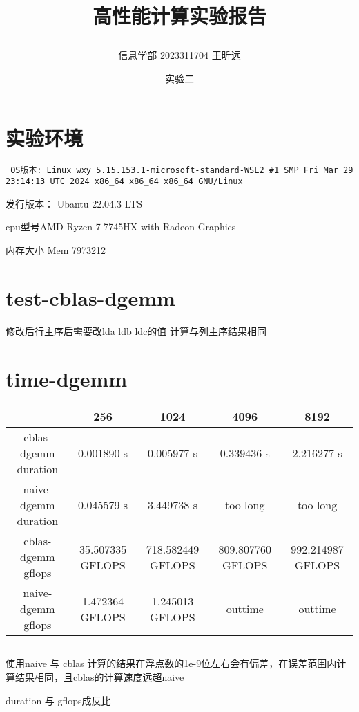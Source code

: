 \documentclass{article} %
\begin{document}
    \title{\centerline{高性能计算实验报告}}
    \date{实验二}
    \author{信息学部 2023311704 王昕远}
    \maketitle
    \thispagestyle{empty}
\section{实验环境}
\texttt{ OS版本: Linux wxy 5.15.153.1-microsoft-standard-WSL2 \#1 SMP Fri Mar 29 23:14:13 UTC 2024 x86\_64 x86\_64 x86\_64 GNU/Linux}

发行版本： Ubantu 22.04.3 LTS

cpu型号AMD Ryzen 7 7745HX with Radeon Graphics 

内存大小 Mem 7973212
\section{test-cblas-dgemm}

修改后行主序后需要改lda ldb ldc的值 计算与列主序结果相同




\section{time-dgemm}
\begin{tabular}{|c|c|c|c|c|}
    \hline
     & 256 & 1024 & 4096 & 8192\\ \hline
    cblas-dgemm duration & 0.001890 s & 0.005977 s &0.339436 s&2.216277 s\\ \hline
    naive-dgemm duration &0.045579 s  & 3.449738 s & too long&too long\\ \hline
    cblas-dgemm gflops &35.507335 GFLOPS &  718.582449 GFLOPS&809.807760 GFLOPS&992.214987 GFLOPS\\ \hline
    naive-dgemm gflops & 1.472364 GFLOPS & 1.245013 GFLOPS & outtime&outtime\\ \hline
\end{tabular}

$$
$$

使用naive 与 cblas 计算的结果在浮点数的1e-9位左右会有偏差，在误差范围内计算结果相同，且cblas的计算速度远超naive 

duration 与 gflops成反比
\end{document}
